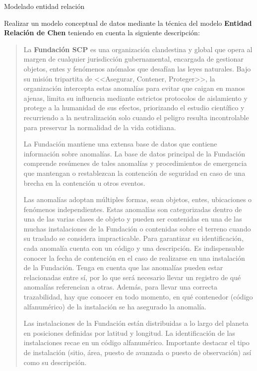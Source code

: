 \documentclass[
    12pt,
    a4paper,
    addpoints,
    answers,
    convocatoria=ord,
    titulacion=NoCD,
    curso=2025/2026,
]{db-exam}
\begin{document}
\begin{questions}

\question[2\half] Modelado entidad relación

Realizar un modelo conceptual de datos mediante la técnica del modelo \textbf{Entidad Relación de Chen} teniendo en cuenta la siguiente descripción:

\begin{quotation}
La \textbf{Fundación SCP} es una organización clandestina y global que opera al margen de cualquier jurisdicción gubernamental, encargada de gestionar objetos, entes y fenómenos anómalos que desafían las leyes naturales. Bajo su misión tripartita de <<Asegurar, Contener, Proteger>>, la organización intercepta estas anomalías para evitar que caigan en manos ajenas, limita su influencia mediante estrictos protocolos de aislamiento y protege a la humanidad de sus efectos, priorizando el estudio científico y recurriendo a la neutralización solo cuando el peligro resulta incontrolable para preservar la normalidad de la vida cotidiana.

La Fundación mantiene una extensa base de datos que contiene información sobre anomalías. La base de datos principal de la Fundación comprende resúmenes de tales anomalías y procedimientos de emergencia que mantengan o restablezcan la contención de seguridad en caso de una brecha en la contención u otros eventos.

Las anomalías adoptan múltiples formas, sean objetos, entes, ubicaciones o fenómenos independientes. Estas anomalías son categorizadas dentro de una de las varias clases de objeto y pueden ser contenidas en una de las muchas instalaciones de la Fundación o contenidas sobre el terreno cuando su traslado se considera impracticable. Para garantizar su identificación, cada anomalía cuenta con un código y una descripción. Es indispensable conocer la fecha de contención en el caso de realizarse en una instalación de la Fundación. Tenga en cuenta que las anomalías pueden estar relacionadas entre sí, por lo que será necesario llevar un registro de qué anomalías referencian a otras. Además, para llevar una correcta trazabilidad, hay que conocer en todo momento, en qué contenedor (código alfanumérico) de la instalación se ha asegurado la anomalía.

Las instalaciones de la Fundación están distribuidas a lo largo del planeta en posiciones definidas por latitud y longitud. La identificación de las instalaciones recae en un código alfanumérico. Importante destacar el tipo de instalación (sitio, área, puesto de avanzada o puesto de observación) así como su descripción.


\end{quotation}
\end{questions}
\end{document}
